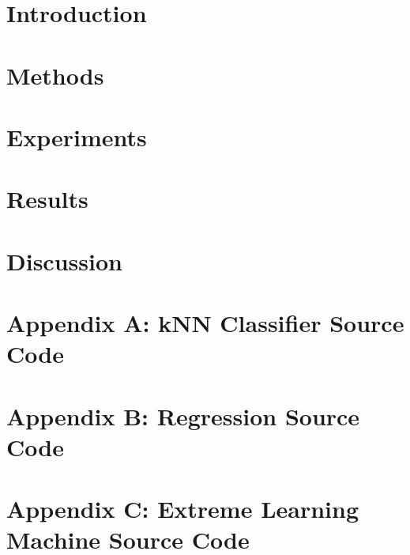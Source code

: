 \documentclass[twoside]{article}
\begin{document}
\begin{multicols}{2} %

\section{Introduction}



\section{Methods}



\section{Experiments}



\section{Results}



\section{Discussion}







\section{Appendix A: kNN Classifier Source Code}

\section{Appendix B: Regression Source Code}

\section{Appendix C: Extreme Learning Machine Source Code}



\end{multicols}
\end{document}
